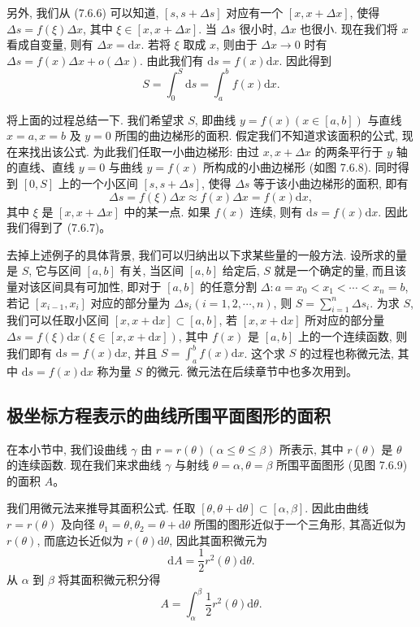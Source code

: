 \documentclass[UTF8,12pt,a4paper,fontset=fandol]{ctexart}
\begin{document}
另外, 我们从 (7.6.6) 可以知道, $[s,s+\Delta s]$ 对应有一个 $[x,x+\Delta x]$, 使得 $\Delta s=f(\xi)\Delta x$, 其中 $\xi\in[x,x+\Delta x]$. 当 $\Delta s$ 很小时, $\Delta x$ 也很小. 现在我们将 $x$ 看成自变量, 则有 $\Delta x=\mathrm dx$. 若将 $\xi$ 取成 $x$, 则由于 $\Delta x\to0$ 时有 $\Delta s=f(x)\Delta x+o(\Delta x)$. 由此我们有 $\mathrm ds=f(x)\mathrm dx$. 因此得到
\begin{equation}
  S=\int_0^S\mathrm ds=\int_a^b f(x)\mathrm dx.
  \tag{7.6.7}
\end{equation}

将上面的过程总结一下. 我们希望求 $S$, 即曲线 $y=f(x)(x\in[a,b])$ 与直线 $x=a,x=b$ 及 $y=0$ 所围的曲边梯形的面积. 假定我们不知道求该面积的公式, 现在来找出该公式. 为此我们任取一小曲边梯形: 由过 $x,x+\Delta x$ 的两条平行于 $y$ 轴的直线、直线 $y=0$ 与曲线 $y=f(x)$ 所构成的小曲边梯形 (如图 7.6.8). 同时得到 $[0,S]$ 上的一个小区间 $[s,s+\Delta s]$, 使得 $\Delta s$ 等于该小曲边梯形的面积, 即有
\[
  \Delta s=f(\xi)\Delta x\approx f(x)\Delta x=f(x)\mathrm dx,
\]
其中 $\xi$ 是 $[x,x+\Delta x]$ 中的某一点. 如果 $f(x)$ 连续, 则有 $\mathrm ds=f(x)\mathrm dx$. 因此我们得到了 (7.6.7)。

去掉上述例子的具体背景, 我们可以归纳出以下求某些量的一般方法. 设所求的量是 $S$, 它与区间 $[a,b]$ 有关, 当区间 $[a,b]$ 给定后, $S$ 就是一个确定的量, 而且该量对该区间具有可加性, 即对于 $[a,b]$ 的任意分割 $\Delta:a=x_0<x_1<\cdots<x_n=b$, 若记 $[x_{i-1},x_i]$ 对应的部分量为 $\Delta s_i(i=1,2,\cdots,n)$, 则 $S=\sum_{i=1}^n\Delta s_i$. 为求 $S$, 我们可以任取小区间 $[x,x+\mathrm dx]\subset[a,b]$, 若 $[x,x+\mathrm dx]$ 所对应的部分量 $\Delta s=f(\xi)\mathrm dx(\xi\in[x,x+\mathrm dx])$, 其中 $f(x)$ 是 $[a,b]$ 上的一个连续函数, 则我们即有 $\mathrm ds=f(x)\mathrm dx$, 并且 $S=\int_a^b f(x)\mathrm dx$. 这个求 $S$ 的过程也称微元法, 其中 $\mathrm ds=f(x)\mathrm dx$ 称为量 $S$ 的微元. 微元法在后续章节中也多次用到。

\subsection{极坐标方程表示的曲线所围平面图形的面积}

在本小节中, 我们设曲线 $\gamma$ 由 $r=r(\theta)(\alpha\leq\theta\leq\beta)$ 所表示, 其中 $r(\theta)$ 是 $\theta$ 的连续函数. 现在我们来求曲线 $\gamma$ 与射线 $\theta=\alpha,\theta=\beta$ 所围平面图形 (见图 7.6.9) 的面积 $A$。

我们用微元法来推导其面积公式. 任取 $[\theta,\theta+\mathrm d\theta]\subset[\alpha,\beta]$. 因此由曲线 $r=r(\theta)$ 及向径 $\theta_1=\theta,\theta_2=\theta+\mathrm d\theta$ 所围的图形近似于一个三角形, 其高近似为 $r(\theta)$, 而底边长近似为 $r(\theta)\mathrm d\theta$, 因此其面积微元为
\[
  \mathrm dA=\frac{1}{2}r^2(\theta)\mathrm d\theta.
\]
从 $\alpha$ 到 $\beta$ 将其面积微元积分得
\[
  A=\int_\alpha^\beta\frac{1}{2}r^2(\theta)\mathrm d\theta.
\]
\end{document}
